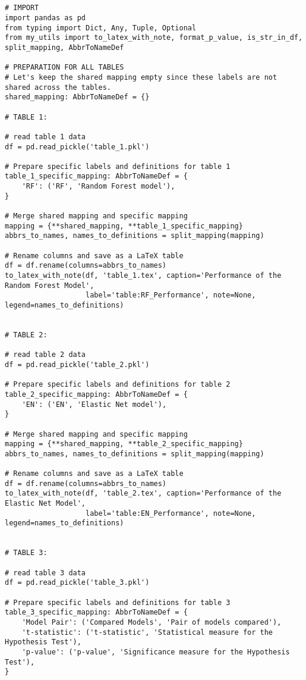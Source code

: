 \documentclass[11pt]{article}
\begin{document}
\begin{verbatim}


# IMPORT
import pandas as pd
from typing import Dict, Any, Tuple, Optional
from my_utils import to_latex_with_note, format_p_value, is_str_in_df, split_mapping, AbbrToNameDef

# PREPARATION FOR ALL TABLES
# Let's keep the shared mapping empty since these labels are not shared across the tables.
shared_mapping: AbbrToNameDef = {}

# TABLE 1:

# read table 1 data
df = pd.read_pickle('table_1.pkl')

# Prepare specific labels and definitions for table 1
table_1_specific_mapping: AbbrToNameDef = {
    'RF': ('RF', 'Random Forest model'),
}

# Merge shared mapping and specific mapping
mapping = {**shared_mapping, **table_1_specific_mapping}
abbrs_to_names, names_to_definitions = split_mapping(mapping)

# Rename columns and save as a LaTeX table
df = df.rename(columns=abbrs_to_names)
to_latex_with_note(df, 'table_1.tex', caption='Performance of the Random Forest Model', 
                   label='table:RF_Performance', note=None, legend=names_to_definitions)


# TABLE 2:

# read table 2 data
df = pd.read_pickle('table_2.pkl')

# Prepare specific labels and definitions for table 2
table_2_specific_mapping: AbbrToNameDef = {
    'EN': ('EN', 'Elastic Net model'),
}

# Merge shared mapping and specific mapping
mapping = {**shared_mapping, **table_2_specific_mapping}
abbrs_to_names, names_to_definitions = split_mapping(mapping)

# Rename columns and save as a LaTeX table
df = df.rename(columns=abbrs_to_names)
to_latex_with_note(df, 'table_2.tex', caption='Performance of the Elastic Net Model', 
                   label='table:EN_Performance', note=None, legend=names_to_definitions)


# TABLE 3:

# read table 3 data
df = pd.read_pickle('table_3.pkl')

# Prepare specific labels and definitions for table 3
table_3_specific_mapping: AbbrToNameDef = {
    'Model Pair': ('Compared Models', 'Pair of models compared'),
    't-statistic': ('t-statistic', 'Statistical measure for the Hypothesis Test'),
    'p-value': ('p-value', 'Significance measure for the Hypothesis Test'),
}


\end{verbatim}
\end{document}
